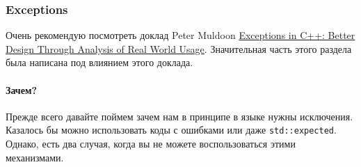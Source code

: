 \subsubsection{Exceptions}

Очень рекомендую посмотреть доклад Peter Muldoon \href{https://youtu.be/HXJmrMnnDYQ?si=uylqtbTLdzKMrg9S}{Exceptions in C++: Better Design Through Analysis of Real World Usage}.
Значительная часть этого раздела была написана под влиянием этого доклада.

\paragraph{Зачем?}

Прежде всего давайте поймем зачем нам в принципе в языке нужны исключения.
Казалось бы можно использовать коды с ошибками или даже \verb"std::expected".
Однако, есть два случая, когда вы не можете воспользоваться этими механизмами.
